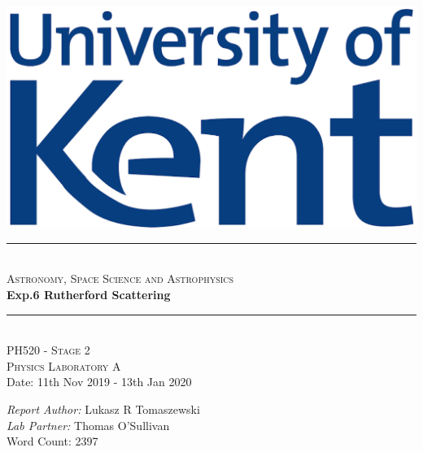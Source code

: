 \documentclass[12pt]{article}
\title{}
\begin{document}
\begin{titlepage}
\newcommand{\HRule}{\rule{\linewidth}{0.5mm}}
\begin{centering} 
\includegraphics[scale=0.6]{Images/Uni_of_Kent.png}\\[1cm]
\HRule \\[0.4cm]
\textsc{\large Astronomy, Space Science and Astrophysics}\\[0.5cm]
{ \Huge \bfseries Exp.6 Rutherford Scattering}\\[0.4cm]
\HRule \\[1.0cm]
\textsc{\Large PH520 - Stage 2}\\[0.5cm] 
\textsc{\Large Physics Laboratory A}\\[0.5cm] 
{\large Date: 11th Nov 2019 - 13th Jan 2020}\\[0.5cm]
\begin{minipage}{0.625\textwidth}
\begin{center} \large
\emph{Report Author:} Lukasz R Tomaszewski \\[0.2cm]
\emph{Lab Partner:} Thomas O'Sullivan \\ [0.5cm]
{\large Word Count: 2397}\\
\end{center}
\end{minipage}\\[2cm]
\vfill
\end{centering} 
\end{titlepage}
\end{document}
